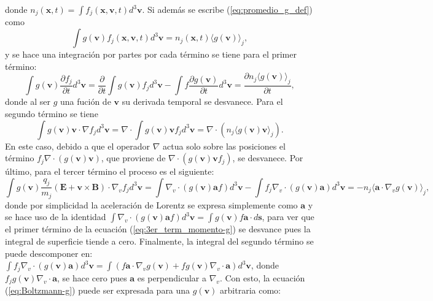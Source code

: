 \documentclass[../tesis_main_file.tex]{subfiles}
\begin{document}
donde $n_j(\textbf{x},t)=\int f_j(\textbf{x},\textbf{v},t) d^3\textbf{v}$.
Si además se escribe (\ref{eq:promedio_g_def}) como
\begin{equation}
    \label{eq:promedio_def_2}
    \int g(\textbf{v})f_j(\textbf{x},\textbf{v},t)d^3\textbf{v}= n_j(\textbf{x},t)\langle g(\textbf{v}) \rangle _j,
    \end{equation}
y se hace una integración por partes por cada término se tiene para el primer término:
\begin{equation}
    \int g(\textbf{v})\frac{\partial f_j}{\partial t}d^3 \textbf{v}=\frac{\partial}{\partial t}\int g(\textbf{v})f_jd^3\textbf{v}-\int f\frac{\partial g(\textbf{v})}{\partial t}d^3\textbf{v}=\frac{\partial n_j \langle g(\textbf{v})\rangle_j}{\partial t},
\end{equation}
donde al ser $g$ una fución de $\textbf{v}$ su derivada temporal se desvanece.
Para el segundo término se tiene
\begin{equation}
    \int g(\textbf{v})\textbf{v}\cdot \nabla f_j d^3 \textbf{v}= \nabla \cdot \int g(\textbf{v})\textbf{v}f_j d^3\textbf{v}=\nabla \cdot \left(n_j \langle g(\textbf{v})\textbf{v} \rangle_j \right).
\end{equation}
En este caso, debido a que el operador $\nabla$ actua solo sobre las posiciones el término $f_j \nabla \cdot (g(\textbf{v})\textbf{v})$, que proviene de $\nabla \cdot (g(\textbf{v})\textbf{v}f_j)$, se desvanece.
Por último, para el tercer término el proceso es el siguiente:
    \begin{equation}
    \label{eq:3er_term_momento-g}
    \int g(\textbf{v})\frac{q_j}{m_j}\left( \textbf{E} + \textbf{v} \times \textbf{B}\right)\cdot \nabla _v f_j d^3 \textbf{v}= \int \nabla_v\cdot (g(\textbf{v})\textbf{a}f)d^3\textbf{v}- \int f_j \nabla_v\cdot (g(\textbf{v})\textbf{a})d^3\textbf{v}=-n_j\langle \textbf{a}\cdot \nabla_v g(\textbf{v})\rangle_j,
    \end{equation}
donde por simplicidad la aceleración de Lorentz se expresa simplemente como $\textbf{a}$ y se hace uso de la identidad $\int \nabla_v\cdot (g(\textbf{v})\textbf{a}f)d^3\textbf{v}=\int g(\textbf{v})f\textbf{a}\cdot d\textbf{s}$, para ver que el primer término de la ecuación (\ref{eq:3er_term_momento-g}) se desvance pues la integral de superficie tiende a cero. 
Finalmente, la integral del segundo término se puede descomponer en: $\int f_j\nabla _v \cdot (g(\textbf{v})\textbf{a})d^3\textbf{v} = \int (f\textbf{a} \cdot \nabla_v g(\textbf{v}) + fg(\textbf{v})\nabla_v \cdot \textbf{a})d^3\textbf{v}$, donde $f_jg(\textbf{v})\nabla_v \cdot \textbf{a}$, se hace cero pues $\textbf{a}$ es perpendicular a $\nabla_v$. Con esto, la ecuación (\ref{eq:Boltzmann-g}) puede ser expresada para una $g(\textbf{v})$ arbitraria como:
\end{document}
